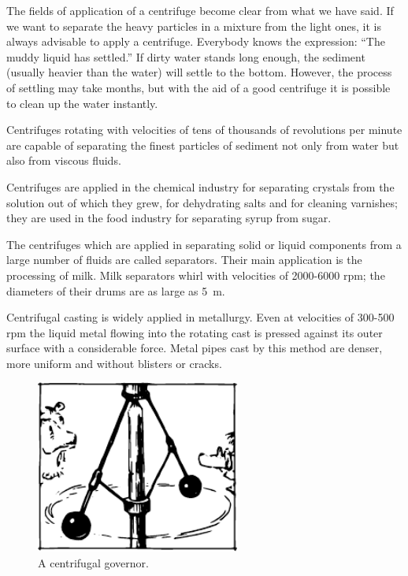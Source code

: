 The fields of application of a centrifuge become clear
from what we have said. If we want to separate the heavy
particles in a mixture from the light ones, it is always
advisable to apply a centrifuge. Everybody knows the
expression: ``The muddy liquid has settled.'' If dirty
water stands long enough, the sediment (usually heavier
than the water) will settle to the bottom. However, the
process of settling may take months, but with the aid
of a good centrifuge it is possible to clean up the water
instantly.

Centrifuges rotating with velocities of tens of thousands
of revolutions per minute are capable of separating the
finest particles of sediment not only from water but also
from viscous fluids.

Centrifuges are applied in the chemical industry for
separating crystals from the solution out of which they
grew, for dehydrating salts and for cleaning varnishes;
they are used in the food industry for separating syrup
from sugar.

The centrifuges which are applied in separating solid
or liquid components from a large number of fluids are
called separators. Their main application is the processing
of milk. Milk separators whirl with velocities of 2000-6000 rpm; the diameters of their drums are as large
as \SI{5}{\meter}.

Centrifugal casting is widely applied in metallurgy.
Even at velocities of 300-500 rpm the liquid metal flowing
into the rotating cast is pressed against its outer surface
with a considerable force. Metal pipes cast by this method
are denser, more uniform and without blisters or cracks.

\begin{figure}[!ht]
\centering
\includegraphics[width=0.6\textwidth]{figures/fig-02-13.pdf}
\caption{A centrifugal governor.}
\label{fig-2.13}
\end{figure}

